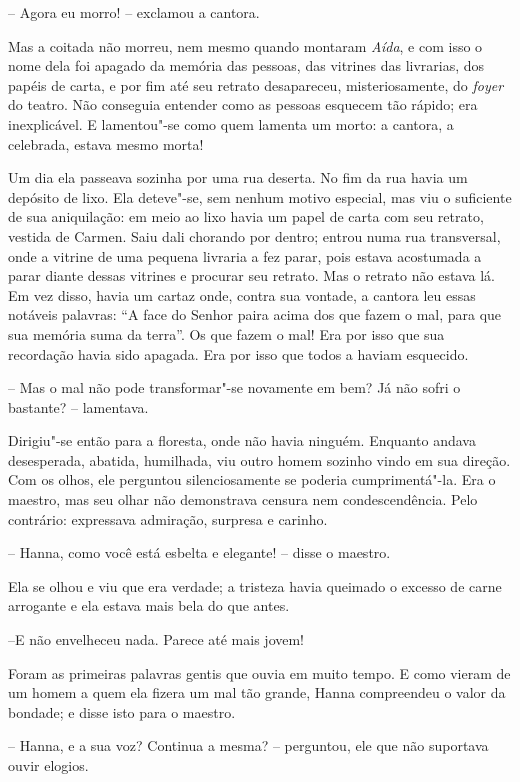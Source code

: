 -- Agora eu morro! -- exclamou a cantora.

Mas a coitada não morreu, nem mesmo quando montaram \textit{Aída}, e com
isso o nome dela foi apagado da memória das pessoas, das vitrines das
livrarias, dos papéis de carta, e por fim até seu retrato desapareceu,
misteriosamente, do \textit{foyer} do teatro. Não conseguia entender
como as pessoas esquecem tão rápido; era inexplicável. E lamentou"-se
como quem lamenta um morto: a cantora, a celebrada, estava mesmo morta!

Um dia ela passeava sozinha por uma rua deserta. No fim da rua havia um
depósito de lixo. Ela deteve"-se, sem nenhum motivo especial, mas viu
o suficiente de sua aniquilação: em meio ao lixo havia um papel de
carta com seu retrato, vestida de Carmen. Saiu dali chorando por
dentro; entrou numa rua transversal, onde a vitrine de uma pequena
livraria a fez parar, pois estava acostumada a parar diante dessas
vitrines e procurar seu retrato. Mas o retrato não estava lá. Em vez
disso, havia um cartaz onde, contra sua vontade, a cantora leu essas
notáveis palavras: ``A face do Senhor paira acima dos que fazem o mal,
para que sua memória suma da terra''. Os que fazem o mal! Era por isso
que sua recordação havia sido apagada. Era por isso que todos a haviam
esquecido.

-- Mas o mal não pode transformar"-se novamente em bem? Já não sofri o
bastante? -- lamentava.

Dirigiu"-se então para a floresta, onde não havia ninguém. Enquanto
andava desesperada, abatida, humilhada, viu outro homem sozinho vindo
em sua direção. Com os olhos, ele perguntou silenciosamente se poderia
cumprimentá"-la. Era o maestro, mas seu olhar não demonstrava censura
nem condescendência. Pelo contrário: expressava admiração, surpresa e
carinho.

-- Hanna, como você está esbelta e elegante! -- disse o maestro.

Ela se olhou e viu que era verdade; a tristeza havia queimado o excesso
de carne arrogante e ela estava mais bela do que antes.

--E não envelheceu nada. Parece até mais jovem!

Foram as primeiras palavras gentis que ouvia em muito tempo. E como
vieram de um homem a quem ela fizera um mal tão grande, Hanna
compreendeu o valor da bondade; e disse isto para o maestro.

-- Hanna, e a sua voz? Continua a mesma? -- perguntou, ele que não
suportava ouvir elogios.

